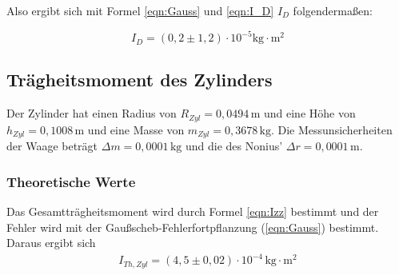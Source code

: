 Also ergibt sich mit Formel \ref{eqn:Gauss} und \ref{eqn:I_D} $I_D$ folgendermaßen:

\begin{equation}
  I_D = \left(0,2 \pm 1,2 \right)\cdot 10^{-5} \mathrm{kg \cdot m^2}
\end{equation}

\subsection{Trägheitsmoment des Zylinders}
\label{sec:TraegheitsmomentdesZylinders}
Der Zylinder hat einen Radius von $R_{Zyl} = 0{,}0494 \, \mathrm{m}$ und eine Höhe von $h_{Zyl} = 0{,}1008 \, \mathrm{m}$
und eine Masse von $m_{Zyl} = 0{,}3678 \, \mathrm{kg}$.
Die Messunsicherheiten der Waage beträgt $\Delta m = 0,0001\, \mathrm{kg}$ und die des Nonius' $\Delta r = 0,0001\, \mathrm{m}$.
\subsubsection{Theoretische Werte}
Das Gesamtträgheitsmoment wird durch Formel \ref{eqn:Izz} bestimmt und der Fehler wird mit der Gaußscheb-Fehlerfortpflanzung (\ref{eqn:Gauss}) bestimmt.
Daraus ergibt sich
\begin{align*}
  I_{Th, Zyl} = \left(4{,}5 \pm 0{,}02 \right) \cdot 10^{-4} \, \mathrm{kg}\cdot\mathrm{m^2}
\end{align*}

